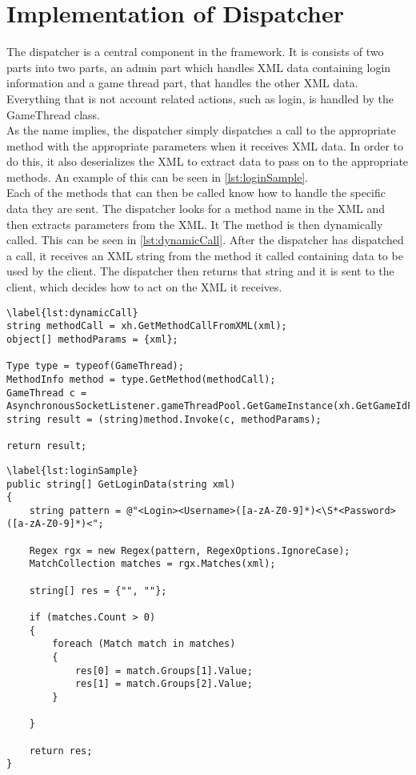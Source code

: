 \section{Implementation of Dispatcher}
\label{chap:dispImplementation}
The dispatcher is a central component in the framework. It is consists of two parts into two parts, an admin part which handles XML data containing login information and a game thread part, that handles the other XML data. Everything that is not account related actions, such as login, is handled by the GameThread class.\\

 As the name implies, the dispatcher simply dispatches a call to the appropriate method with the appropriate parameters when it receives XML data. In order to do this, it also deserializes the XML to extract data to pass on to the appropriate methods. An example of this can be seen in \cref{lst:loginSample}.\\
 
 Each of the methods that can then be called know how to handle the specific data they are sent. The dispatcher looks for a method name in the XML and then extracts parameters from the XML. It The method is then dynamically called. This can be seen in \cref{lst:dynamicCall}. After the dispatcher has dispatched a call, it receives an XML string from the method it called containing data to be used by the client. The dispatcher then returns that string and it is sent to the client, which decides how to act on the XML it receives.

\begin{lstlisting}
\label{lst:dynamicCall}
string methodCall = xh.GetMethodCallFromXML(xml);
object[] methodParams = {xml};

Type type = typeof(GameThread);
MethodInfo method = type.GetMethod(methodCall);
GameThread c = AsynchronousSocketListener.gameThreadPool.GetGameInstance(xh.GetGameIdFromXML(xml));
string result = (string)method.Invoke(c, methodParams);

return result;
\end{lstlisting}

\begin{lstlisting}
\label{lst:loginSample}
public string[] GetLoginData(string xml) 
{
    string pattern = @"<Login><Username>([a-zA-Z0-9]*)<\S*<Password>([a-zA-Z0-9]*)<";

    Regex rgx = new Regex(pattern, RegexOptions.IgnoreCase);
    MatchCollection matches = rgx.Matches(xml);

    string[] res = {"", ""};

    if (matches.Count > 0)
    {
        foreach (Match match in matches)
        {
            res[0] = match.Groups[1].Value;
            res[1] = match.Groups[2].Value;
        }
            
    }

    return res;
}
\end{lstlisting}